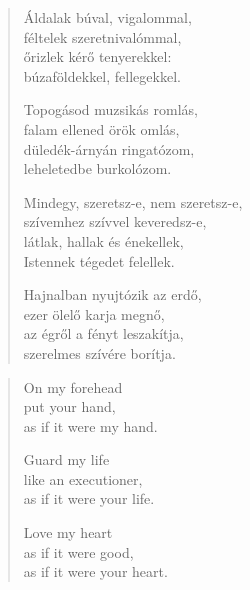 \documentclass[11pt]{extbook}
\newcommand*{\centeredornament}{\centerline{\pgfornament[width=6cm]{88}}}
\begin{document}
\newpage

\vspace*{-15mm}
\centeredornament



\begin{verse}
  Áldalak búval, vigalommal, \\
  féltelek szeretnivalómmal, \\
  őrizlek kérő tenyerekkel: \\
  búzaföldekkel, fellegekkel.

  Topogásod muzsikás romlás, \\
  falam ellened örök omlás, \\
  düledék-árnyán ringatózom, \\
  leheletedbe burkolózom.

  Mindegy, szeretsz-e, nem szeretsz-e, \\
  szívemhez szívvel keveredsz-e, \\
  látlak, hallak és énekellek, \\
  Istennek tégedet felellek.

  Hajnalban nyujtózik az erdő, \\
  ezer ölelő karja megnő, \\
  az égről a fényt leszakítja, \\
  szerelmes szívére borítja.
\end{verse}

\newpage


\vspace*{-15mm}
\centeredornament



\begin{verse}
  On my forehead \\
  put your hand, \\
  as if it were my hand.

  Guard my life \\
  like an executioner, \\
  as if it were your life.

  Love my heart \\
  as if it were good, \\
  as if it were your heart.
\end{verse}
\end{document}
